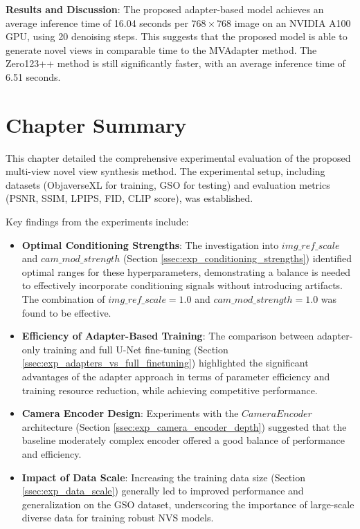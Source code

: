 \textbf{Results and Discussion}: The proposed adapter-based model achieves an average inference time of 16.04 seconds per $768 \times 768$ image on an NVIDIA A100 GPU, using 20 denoising steps. This suggests that the proposed model is able to generate novel views in comparable time to the MVAdapter method. The Zero123++ method is still significantly faster, with an average inference time of 6.51 seconds.

\section{Chapter Summary}\label{sec:exp_summary}
This chapter detailed the comprehensive experimental evaluation of the proposed multi-view novel view synthesis method. The experimental setup, including datasets (ObjaverseXL for training, GSO for testing) and evaluation metrics (PSNR, SSIM, LPIPS, FID, CLIP score), was established.

Key findings from the experiments include:
\begin{itemize}
  \item \textbf{Optimal Conditioning Strengths}: The investigation into $img\_ref\_scale$ and $cam\_mod\_strength$ (Section \ref{ssec:exp_conditioning_strengths}) identified optimal ranges for these hyperparameters, demonstrating a balance is needed to effectively incorporate conditioning signals without introducing artifacts. The combination of $img\_ref\_scale=1.0$ and $cam\_mod\_strength=1.0$ was found to be effective.
  \item \textbf{Efficiency of Adapter-Based Training}: The comparison between adapter-only training and full U-Net fine-tuning (Section \ref{ssec:exp_adapters_vs_full_finetuning}) highlighted the significant advantages of the adapter approach in terms of parameter efficiency and training resource reduction, while achieving competitive performance.
  \item \textbf{Camera Encoder Design}: Experiments with the $CameraEncoder$ architecture (Section \ref{ssec:exp_camera_encoder_depth}) suggested that the baseline moderately complex encoder offered a good balance of performance and efficiency.
  \item \textbf{Impact of Data Scale}: Increasing the training data size (Section \ref{ssec:exp_data_scale}) generally led to improved performance and generalization on the GSO dataset, underscoring the importance of large-scale diverse data for training robust NVS models.
\end{itemize}

